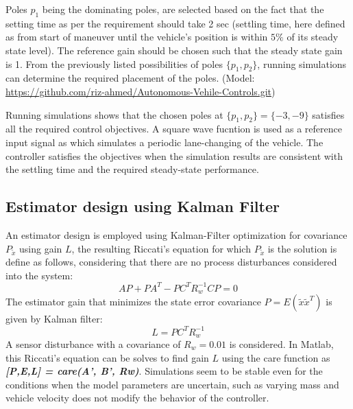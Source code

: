 Poles $p_1$ being the dominating poles, are selected based on the fact that the setting time as per the requirement should take 2 sec (settling time, here defined as from start of maneuver until the vehicle's position is within $5\%$ of its steady state level). The reference gain should be chosen such that the steady state gain is 1. From the previously listed possibilities of poles $\{p_1, p_2\}$, running simulations can determine the required placement of the poles. (Model: \url{https://github.com/riz-ahmed/Autonomous-Vehile-Controls.git})

Running simulations shows that the chosen poles at $\{p_1, p_2\} = \{ -3,-9 \}$ satisfies all the required control objectives. A square wave fucntion is used as a reference input signal as which simulates a periodic lane-changing of the vehicle. The controller satisfies the objectives when the simulation results are consistent with the settling time and the required steady-state performance.

\subsection{Estimator design using Kalman Filter}

An estimator design is employed using Kalman-Filter optimization for covariance $P_{\tilde{x}}$ using gain $L$, the resulting Riccati's equation for which $P_{\tilde{x}}$ is the solution is define as follows, considering that there are no process disturbances considered into the system:
\begin{equation}
	AP + P A^{T} - PC^{T}R^{-1}_{w}C P = 0
\end{equation}
The estimator gain that minimizes the state error covariance $P = E(\tilde{x}\tilde{x}^{T})$ is given by Kalman filter:
\begin{equation}
	L = P C^{T}R^{-1}_{w}
\end{equation}
A sensor disturbance with a covariance of $R_{w} = 0.01$ is considered. In Matlab, this Riccati's equation can be solves to find gain $L$ using the care function as \textbf{\textit{[P,E,L] = care(A', B', Rw)}}. Simulations seem to be stable even for the conditions when the model parameters are uncertain, such as varying mass and vehicle velocity does not modify the behavior of the controller.






